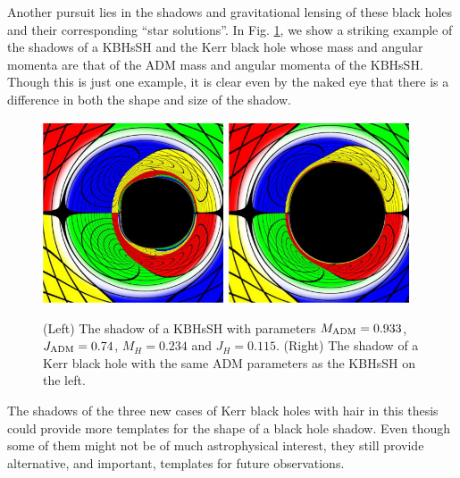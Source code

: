 Another pursuit lies in the shadows and gravitational lensing of these black holes \cite{Cunha:2015yba,Cunha:2016bjh} and their corresponding ``star solutions''.
In Fig. \ref{shadows}, we show a striking example of the shadows of a KBHsSH and the Kerr black hole whose mass and angular momenta are that of the ADM mass and angular momenta of the KBHsSH.
Though this is just one example, it is clear even by the naked eye that there is a difference in both the shape and size of the shadow.

\begin{figure}[h!]
\centering
  \includegraphics[width=0.48\textwidth]{Figs/skuggi2a.pdf}
  \includegraphics[width=0.48\textwidth]{Figs/skuggi2b.pdf}
  \caption{(Left) The shadow of a KBHsSH with parameters $M_{\rm ADM}=0.933$, $J_{\rm ADM}=0.74$, $M_H=0.234$ and $J_H=0.115$. (Right) The shadow of a Kerr black hole with the same ADM parameters as the KBHsSH on the left.}
\label{shadows}
\end{figure}

The shadows of the three new cases of Kerr black holes with hair in this thesis could provide more templates for the shape of a black hole shadow.
Even though some of them might not be of much astrophysical interest, they still provide alternative, and important, templates for future observations.

